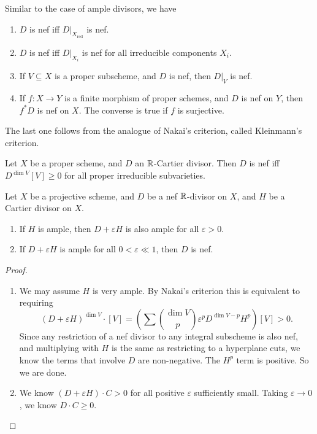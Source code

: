 \documentclass[a4paper]{article}
\DeclareMathOperator\red{red}
\begin{document}
Similar to the case of ample divisors, we have
\begin{prop}\leavevmode
  \begin{enumerate}
    \item $D$ is nef iff $D|_{X_{\red}}$ is nef.
    \item $D$ is nef iff $D|_{X_i}$ is nef for all irreducible components $X_i$.
    \item If $V \subseteq X$ is a proper subscheme, and $D$ is nef, then $D|_V$ is nef.
    \item If $f: X \to Y$ is a finite morphism of proper schemes, and $D$ is nef on $Y$, then $f^* D$ is nef on $X$. The converse is true if $f$ is surjective.\fakeqed
  \end{enumerate}
\end{prop}
The last one follows from the analogue of Nakai's criterion, called Kleinmann's criterion.
\begin{thm}
  Let $X$ be a proper scheme, and $D$ an $\mathbb{R}$-Cartier divisor. Then $D$ is nef iff $D^{\dim V}[V] \geq 0$ for all proper irreducible subvarieties.
\end{thm}

\begin{cor}
  Let $X$ be a projective scheme, and $D$ be a nef $\mathbb{R}$-divisor on $X$, and $H$ be a Cartier divisor on $X$.
  \begin{enumerate}
    \item If $H$ is ample, then $D + \varepsilon H$ is also ample for all $\varepsilon > 0$.
    \item If $D + \varepsilon H$ is ample for all $0 < \varepsilon \ll 1$, then $D$ is nef.
  \end{enumerate}
\end{cor}

\begin{proof}\leavevmode
  \begin{enumerate}
    \item We may assume $H$ is very ample. By Nakai's criterion this is equivalent to requiring
      \[
        (D + \varepsilon H)^{\dim V}\cdot [V] = \left(\sum \binom{\dim V}{p} \varepsilon^p D^{\dim V - p} H^p\right)[V] > 0.
      \]
      Since any restriction of a nef divisor to any integral subscheme is also nef, and multiplying with $H$ is the same as restricting to a hyperplane cuts, we know the terms that involve $D$ are non-negative. The $H^p$ term is positive. So we are done.
    \item We know $(D + \varepsilon H) \cdot C > 0$ for all positive $\varepsilon$ sufficiently small. Taking $\varepsilon \to 0$, we know $D \cdot C \geq 0$.\qedhere
  \end{enumerate}
\end{proof}
\end{document}
